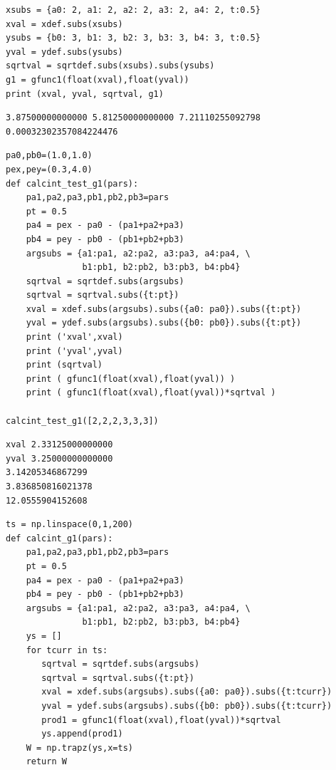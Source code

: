 \documentclass[12pt,fleqn]{article}\usepackage{../../common}
\begin{document}
\begin{verbatim}
xsubs = {a0: 2, a1: 2, a2: 2, a3: 2, a4: 2, t:0.5}
xval = xdef.subs(xsubs)
ysubs = {b0: 3, b1: 3, b2: 3, b3: 3, b4: 3, t:0.5}
yval = ydef.subs(ysubs)
sqrtval = sqrtdef.subs(xsubs).subs(ysubs)
g1 = gfunc1(float(xval),float(yval))
print (xval, yval, sqrtval, g1)
\end{verbatim}

\begin{verbatim}
3.87500000000000 5.81250000000000 7.21110255092798 0.00032302357084224476
\end{verbatim}

\begin{verbatim}
pa0,pb0=(1.0,1.0)
pex,pey=(0.3,4.0)
def calcint_test_g1(pars):
    pa1,pa2,pa3,pb1,pb2,pb3=pars
    pt = 0.5
    pa4 = pex - pa0 - (pa1+pa2+pa3)
    pb4 = pey - pb0 - (pb1+pb2+pb3)
    argsubs = {a1:pa1, a2:pa2, a3:pa3, a4:pa4, \
               b1:pb1, b2:pb2, b3:pb3, b4:pb4}
    sqrtval = sqrtdef.subs(argsubs)
    sqrtval = sqrtval.subs({t:pt})
    xval = xdef.subs(argsubs).subs({a0: pa0}).subs({t:pt})
    yval = ydef.subs(argsubs).subs({b0: pb0}).subs({t:pt})
    print ('xval',xval)
    print ('yval',yval)
    print (sqrtval)
    print ( gfunc1(float(xval),float(yval)) )
    print ( gfunc1(float(xval),float(yval))*sqrtval )
    
calcint_test_g1([2,2,2,3,3,3])
\end{verbatim}

\begin{verbatim}
xval 2.33125000000000
yval 3.25000000000000
3.14205346867299
3.836850816021378
12.0555904152608
\end{verbatim}

\begin{verbatim}
ts = np.linspace(0,1,200)
def calcint_g1(pars):
    pa1,pa2,pa3,pb1,pb2,pb3=pars
    pt = 0.5
    pa4 = pex - pa0 - (pa1+pa2+pa3)
    pb4 = pey - pb0 - (pb1+pb2+pb3)
    argsubs = {a1:pa1, a2:pa2, a3:pa3, a4:pa4, \
               b1:pb1, b2:pb2, b3:pb3, b4:pb4}
    ys = []
    for tcurr in ts:
       sqrtval = sqrtdef.subs(argsubs)
       sqrtval = sqrtval.subs({t:pt})
       xval = xdef.subs(argsubs).subs({a0: pa0}).subs({t:tcurr})
       yval = ydef.subs(argsubs).subs({b0: pb0}).subs({t:tcurr})
       prod1 = gfunc1(float(xval),float(yval))*sqrtval
       ys.append(prod1)
    W = np.trapz(ys,x=ts)
    return W    
\end{verbatim}
\end{document}
